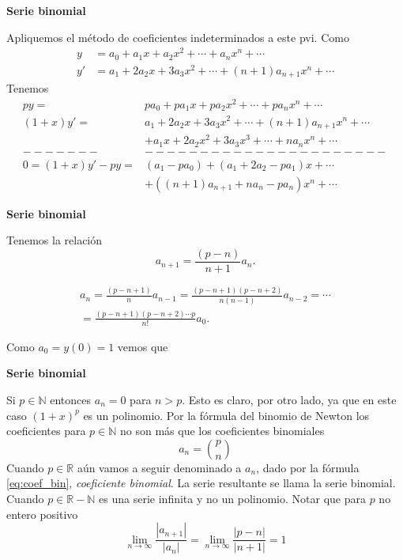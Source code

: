  \begin{frame}[fragile]{\textbf{Serie binomial}}






Apliquemos el método de coeficientes indeterminados a este pvi.
Como
\[\begin{split}
   y&=a_0+a_1x+a_2x^2+\cdots+a_nx^n+\cdots\\
   y'&=a_1+2a_2x+3a_3x^2+\cdots+(n+1)a_{n+1}x^n+\cdots
  \end{split}
\]
Tenemos
\[\begin{split}
   py=&pa_0+pa_1x+pa_2x^2+\cdots+pa_nx^n+\cdots\\
  (1+x)y'=&a_1+2a_2x+3a_3x^2+\cdots+(n+1)a_{n+1}x^n+\cdots\\
          &+a_1x+2a_2x^2+3a_3x^3+\cdots+na_{n}x^n+\cdots\\
-------&----------------------\\
0=(1+x)y'-py =& (a_1-pa_0)+(a_1+2a_2-pa_1)x+\cdots \\
&+((n+1)a_{n+1}+na_n-pa_n)x^n+\cdots
  \end{split}
\]


\end{frame}



 \begin{frame}[fragile]{\textbf{Serie binomial}}

Tenemos la relación
\[ a_{n+1}=\frac{(p-n)}{n+1}a_n.
\]

\begin{multline*}a_n=\frac{(p-n+1)}{n}a_{n-1}=\frac{(p-n+1)(p-n+2)}{n(n-1)}a_{n-2}=\cdots\\=\frac{(p-n+1)(p-n+2)\cdots p}{n!}a_0.
 \end{multline*}

Como $a_0=y(0)=1$ vemos que

\end{frame}



 \begin{frame}[fragile]{\textbf{Serie binomial}}

Si $p\in\mathbb{N}$ entonces $a_n=0$ para $n>p$. Esto es claro, por otro lado, ya que en este caso $(1+x)^p$ es un polinomio. Por la fórmula del binomio de Newton los coeficientes para $p\in \mathbb{N}$  no son más que los coeficientes binomiales
\[a_n=\binom{p}{n}\]
 Cuando $p\in\mathbb{R}$ aún vamos a seguir denominado a $a_n$, dado por la fórmula \eqref{eq:coef_bin},  \emph{ coeficiente binomial}. La serie resultante se llama la serie binomial. Cuando $p\in\mathbb{R}-\mathbb{N}$ es una serie infinita y no  un polinomio. Notar que para $p$ no entero positivo
\[\lim\limits_{n\to\infty}\frac{|a_{n+1}|}{|a_n|}=\lim\limits_{n\to\infty}\frac{|p-n|}{|n+1|}=1\]

\end{frame}



